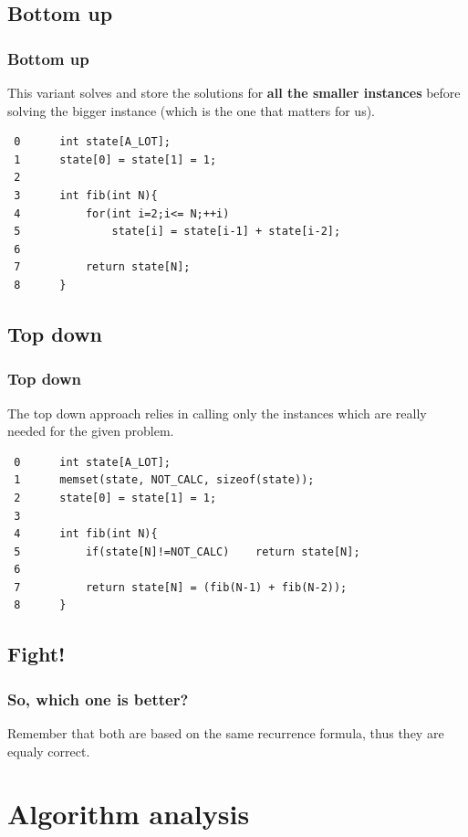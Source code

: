 \documentclass[article]{beamer}
\begin{document}
\subsection{Bottom up}
\begin{frame}[fragile]
	\frametitle{Bottom up}
	This variant solves and store the solutions for \textbf{all the smaller instances} before solving the bigger instance (which is the one that matters for us).
	
	\vspace{2mm}
	\footnotesize{
	\begin{lstlisting}
 0      int state[A_LOT];
 1      state[0] = state[1] = 1;	
 2	
 3      int fib(int N){
 4          for(int i=2;i<= N;++i)
 5              state[i] = state[i-1] + state[i-2]; 
 6 
 7          return state[N];
 8      }
	\end{lstlisting}
	}
\end{frame}

\subsection{Top down}
\begin{frame}[fragile]
	\frametitle{Top down}
	The top down approach relies in calling only the instances which are really needed for the given problem.
	
	\vspace{2mm}
	\footnotesize{
	\begin{lstlisting}
 0      int state[A_LOT];
 1      memset(state, NOT_CALC, sizeof(state));
 2      state[0] = state[1] = 1;
 3	
 4      int fib(int N){
 5          if(state[N]!=NOT_CALC)    return state[N];
 6			
 7          return state[N] = (fib(N-1) + fib(N-2));
 8      }
	\end{lstlisting}
	}
\end{frame}

\subsection{Fight!}
\begin{frame}
	\frametitle{So, which one is better?}
	Remember that both are based on the same recurrence formula, thus they are equaly correct.
\end{frame}

\section{Algorithm analysis}
\end{document}

